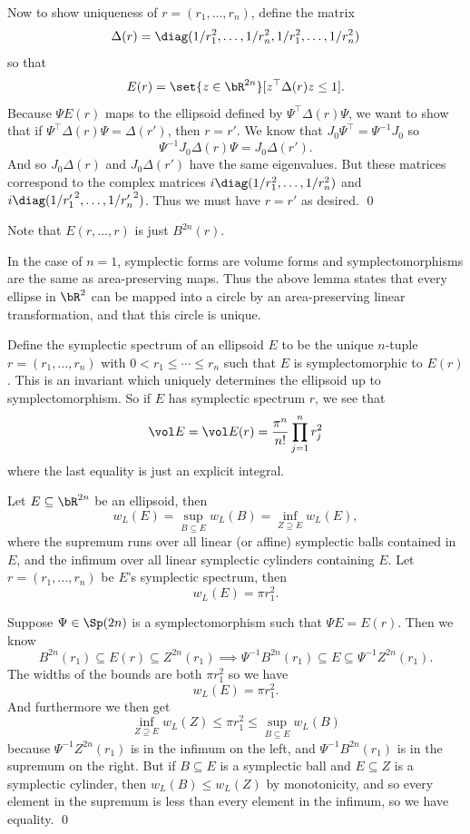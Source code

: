     Now to show uniqueness of $r=(r_1,\dots,r_n)$, define the matrix
    $$ \Delta(r) = \diag(1/r_1^2,\dots,1/r_n^2,1/r_1^2,\dots,1/r_n^2) $$
    so that
    $$ E(r) = \set{z\in\bR^{2n}}[z^\top\Delta(r)z\leq1] . $$
    Because $\Psi E(r)$ maps to the ellipsoid defined by $\Psi^\top\Delta(r)\Psi$, we want to show that if $\Psi^\top\Delta(r)\Psi=\Delta(r')$, then $r=r'$.
    We know that $J_0\Psi^\top=\Psi^{-1}J_0$ so
    $$ \Psi^{-1}J_0\Delta(r)\Psi = J_0\Delta(r') . $$
    And so $J_0\Delta(r)$ and $J_0\Delta(r')$ have the same eigenvalues.
    But these matrices correspond to the complex matrices $i\diag(1/r_1^2,\dots,1/r_n^2)$ and $i\diag(1/{r'_1}^2,\dots,1/{r'_n}^2)$.
    Thus we must have $r=r'$ as desired.
    \qed

\eproof

Note that $E(r,\dots,r)$ is just $B^{2n}(r)$.

\bnote

    In the case of $n=1$, symplectic forms are volume forms and symplectomorphisms are the same as area-preserving maps.
    Thus the above lemma states that every ellipse in $\bR^2$ can be mapped into a circle by an area-preserving linear transformation, and that this circle is unique.

\enote

Define the {\emphcolor symplectic spectrum} of an ellipsoid $E$ to be the unique $n$-tuple $r=(r_1,\dots,r_n)$ with $0<r_1\leq\cdots\leq r_n$ such that $E$ is symplectomorphic to
$E(r)$.
This is an invariant which uniquely determines the ellipsoid up to symplectomorphism.
So if $E$ has symplectic spectrum $r$, we see that
$$ \vol E = \vol E(r) = \frac{\pi^n}{n!}\prod_{j=1}^nr_j^2 $$
where the last equality is just an explicit integral.

\bthrm

    Let $E\subseteq\bR^{2n}$ be an ellipsoid, then
    $$ w_L(E) = \sup_{B\subseteq E}w_L(B) = \inf_{Z\supseteq E}w_L(E) , $$
    where the supremum runs over all linear (or affine) symplectic balls contained in $E$, and the infimum over all linear symplectic cylinders containing $E$.
    Let $r=(r_1,\dots,r_n)$ be $E$'s symplectic spectrum, then
    $$ w_L(E) = \pi r_1^2 . $$

\ethrm

\bproof

    Suppose $\Psi\in\Sp(2n)$ is a symplectomorphism such that $\Psi E=E(r)$.
    Then we know
    $$ B^{2n}(r_1) \subseteq E(r) \subseteq Z^{2n}(r_1) \implies \Psi^{-1}B^{2n}(r_1) \subseteq E \subseteq \Psi^{-1}Z^{2n}(r_1) . $$
    The widths of the bounds are both $\pi r_1^2$ so we have
    $$ w_L(E) = \pi r_1^2 . $$
    And furthermore we then get
    $$ \inf_{Z\supseteq E}w_L(Z) \leq \pi r_1^2 \leq \sup_{B\subseteq E}w_L(B) $$
    because $\Psi^{-1}Z^{2n}(r_1)$ is in the infimum on the left, and $\Psi^{-1}B^{2n}(r_1)$ is in the supremum on the right.
    But if $B\subseteq E$ is a symplectic ball and $E\subseteq Z$ is a symplectic cylinder, then $w_L(B)\leq w_L(Z)$ by monotonicity, and so every element in the supremum
    is less than every element in the infimum, so we have equality.
    \qed

